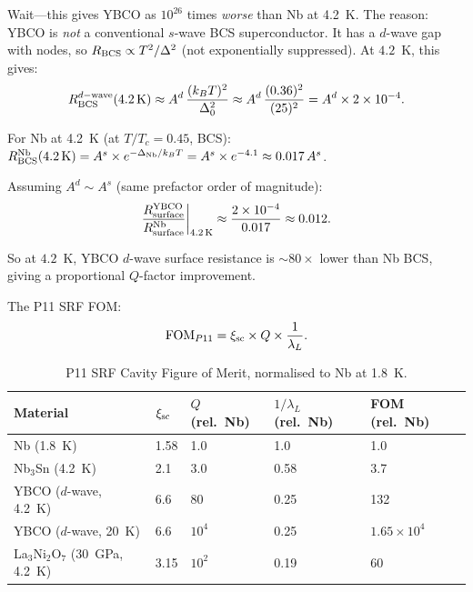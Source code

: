 \documentclass[11pt]{article}
\newcommand{\ee}[1]{\times 10^{#1}}
\begin{document}
Wait---this gives YBCO as $10^{26}$ times \emph{worse} than Nb at 4.2~K.
The reason: YBCO is \emph{not} a conventional $s$-wave BCS superconductor.
It has a $d$-wave gap with nodes, so $R_{\rm BCS} \propto T^2/\Delta^2$
(not exponentially suppressed). At $4.2$~K, this gives:
\begin{equation}
R_{\rm BCS}^{d{\rm -wave}}(4.2\,\text{K}) \approx A^{d}\,\frac{(k_BT)^2}{\Delta_0^2}
\approx A^{d}\,\frac{(0.36)^2}{(25)^2}
= A^{d} \times 2\ee{-4}.
\label{eq:R-dwave}
\end{equation}

For Nb at 4.2~K (at $T/T_c = 0.45$, BCS):
$R_{\rm BCS}^{\rm Nb}(4.2\,\text{K}) = A^s \times e^{-\Delta_{\rm Nb}/k_BT}
= A^s \times e^{-4.1} \approx 0.017\,A^s$.

Assuming $A^d \sim A^s$ (same prefactor order of magnitude):
\begin{equation}
\frac{R_{\rm surface}^{\rm YBCO}}{R_{\rm surface}^{\rm Nb}}\bigg|_{4.2\,\rm K}
\approx \frac{2\ee{-4}}{0.017} \approx 0.012.
\label{eq:R-YBCO-Nb-dwave}
\end{equation}

So at $4.2$~K, YBCO $d$-wave surface resistance is $\sim 80\times$ lower
than Nb BCS, giving a proportional $Q$-factor improvement.

The P11 SRF FOM:
\begin{equation}
\text{FOM}_{P11} = \xi_{\rm sc} \times Q \times \frac{1}{\lambda_L}.
\label{eq:FOM-P11}
\end{equation}

\begin{table}[h]
\centering
\caption{P11 SRF Cavity Figure of Merit, normalised to Nb at 1.8~K.}
\label{tab:FOM-P11}
\begin{tabular}{lllll}
\toprule
Material & $\xi_{\rm sc}$ & $Q$ (rel.\ Nb) & $1/\lambda_L$ (rel.\ Nb) & FOM (rel.\ Nb) \\
\midrule
Nb (1.8~K) & 1.58 & 1.0 & 1.0 & 1.0 \\
Nb$_3$Sn (4.2~K) & 2.1 & 3.0 & 0.58 & 3.7 \\
YBCO ($d$-wave, 4.2~K) & 6.6 & 80 & 0.25 & 132 \\
YBCO ($d$-wave, 20~K) & 6.6 & $10^4$ & 0.25 & $1.65\ee{4}$ \\
La$_3$Ni$_2$O$_7$ (30~GPa, 4.2~K) & 3.15 & $10^2$ & 0.19 & 60 \\
\bottomrule
\end{tabular}
\end{table}
\end{document}
